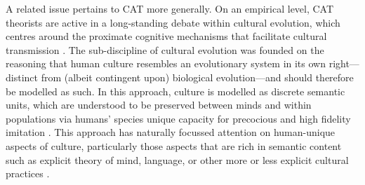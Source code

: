  A related issue pertains to CAT more generally.  On an empirical level, CAT theorists are active in a long-standing debate within cultural evolution, which centres around the proximate cognitive mechanisms that facilitate cultural transmission \citep{Acerbi2015,Scott-Phillips2018}. The sub-discipline of cultural evolution was founded on the reasoning that human culture resembles an evolutionary system in its own right---distinct from (albeit contingent upon) biological evolution---and should therefore be modelled as such.  In this approach, culture is modelled as discrete semantic units, which are understood to be preserved between minds and within populations via humans' species unique capacity for precocious and high fidelity imitation \citep[i.e., like genes, culture is preserved through processes of exact replication with natural copying error and drift][]{Henrich2003,Tomasello2011}. This approach has naturally focussed attention on human-unique aspects of culture, particularly those aspects that are rich in semantic content such as explicit theory of mind, language, or other more or less explicit cultural practices \citep{Tomasello2005}.


